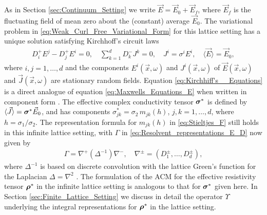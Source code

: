 \documentclass{cmslatex}
\newcommand\bsig{\mbox{\boldmath${\sigma}$}}
\newcommand\brho{\mbox{\boldmath${\rho}$}}
\begin{document}
As in Section \ref{sec:Continuum_Setting} we write
$\vec{E}=\vec{E}_0+\vec{E}_f$, where $\vec{E}_f$ is the fluctuating
field of mean zero about the (constant) average $\vec{E}_0$. 
The variational problem in \eqref{eq:Weak_Curl_Free_Variational_Form}
for this lattice setting has a unique solution satisfying Kirchhoff's
circuit laws \cite{Golden:CMP-473,Bruno:JSP-365}      
%
\begin{align}\label{eq:Kirchhiff's__Equations}
  D_i^+E^j-D_j^+E^i=0, \quad
  \sum_{k=1}^dD_k^-J^k=0, \quad
  J^i=\sigma^iE^i, \quad
  \langle\vec{E}\rangle=\vec{E}_0,
\end{align}
%
where $i,j=1,\ldots,d$ and the components $E^i(\vec{x},\omega)$ and
$J^i(\vec{x},\omega)$ of $\vec{E}(\vec{x},\omega)$ and $\vec{J}(\vec{x},\omega)$ are
stationary random fields.  
Equation \eqref{eq:Kirchhiff's__Equations} is a direct analogue of
equation \eqref{eq:Maxwells_Equations_E} when written in component
form \cite{Golden:CMP-473}. The effective complex 
conductivity tensor $\bsig^*$ is defined by
$\langle\vec{J}\rangle=\bsig^*\vec{E}_0$, and has components
$\sigma^*_{jk}=\sigma_2\,m_{jk}(h)$, $j,k=1,\ldots,d$, where $h=\sigma_1/\sigma_2$. The
representation formula for $m_{jk}(h)$ in \eqref{eq:Stieltjes_F}
still holds in this infinite lattice setting,  
with $\Gamma$ in \eqref{eq:Resolvent_representations_E_D} now given by 
%
\begin{align}\label{eq:Discrete_Gamma}
  \Gamma=\nabla^+(\Delta^{-1})\nabla^-, \quad \nabla^\pm = (D_1^\pm,\ldots,D_d^\pm),
\end{align}
%
where $\Delta^{-1}$ is based on discrete convolution with the lattice
Green's function for the Laplacian $\Delta=\nabla^2$ \cite{Bruno:JSP-365}. The
formulation of the ACM for the effective resistivity tensor $\brho^*$
in the infinite lattice setting is analogous to that for $\bsig^*$
given here. In Section \ref{sec:Finite_Lattice_Setting} we discuss in
detail the operator $\Upsilon$ underlying the integral representations for
$\brho^*$ in the lattice setting. 
\end{document}

